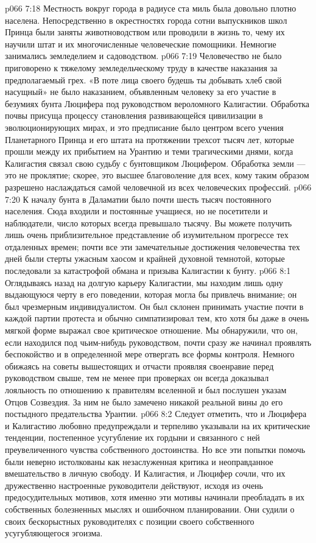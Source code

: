 \vs p066 7:18 \pc Местность вокруг города в радиусе ста миль была довольно плотно населена. Непосредственно в окрестностях города сотни выпускников школ Принца были заняты животноводством или проводили в жизнь то, чему их научили штат и их многочисленные человеческие помощники. Немногие занимались земледелием и садоводством.
\vs p066 7:19 Человечество не было приговорено к тяжелому земледельческому труду в качестве наказания за предполагаемый грех. «В поте лица своего будешь ты добывать хлеб свой насущный» не было наказанием, объявленным человеку за его участие в безумиях бунта Люцифера под руководством вероломного Калигастии. Обработка почвы присуща процессу становления развивающейся цивилизации в эволюционирующих мирах, и это предписание было центром всего учения Планетарного Принца и его штата на протяжении трехсот тысяч лет, которые прошли между их прибытием на Урантию и теми трагическими днями, когда Калигастия связал свою судьбу с бунтовщиком Люцифером. Обработка земли --- это не проклятие; скорее, это высшее благоволение для всех, кому таким образом разрешено наслаждаться самой человечной из всех человеческих профессий.
\vs p066 7:20 К началу бунта в Даламатии было почти шесть тысяч постоянного населения. Сюда входили и постоянные учащиеся, но не посетители и наблюдатели, число которых всегда превышало тысячу. Вы можете получить лишь очень приблизительное представление об изумительном прогрессе тех отдаленных времен; почти все эти замечательные достижения человечества тех дней были стерты ужасным хаосом и крайней духовной темнотой, которые последовали за катастрофой обмана и призыва Калигастии к бунту.
\vs p066 8:1 Оглядываясь назад на долгую карьеру Калигастии, мы находим лишь одну выдающуюся черту в его поведении, которая могла бы привлечь внимание; он был чрезмерным индивидуалистом. Он был склонен принимать участие почти в каждой партии протеста и обычно симпатизировал тем, кто хотя бы даже в очень мягкой форме выражал свое критическое отношение. Мы обнаружили, что он, если находился под чьим\hyp{}нибудь руководством, почти сразу же начинал проявлять беспокойство и в определенной мере отвергать все формы контроля. Немного обижаясь на советы вышестоящих и отчасти проявляя своенравие перед руководством свыше, тем не менее при проверках он всегда доказывал лояльность по отношению к правителям вселенной и был послушен указам Отцов Созвездия. За ним не было замечено никакой реальной вины до его постыдного предательства Урантии.
\vs p066 8:2 Следует отметить, что и Люцифера и Калигастию любовно предупреждали и терпеливо указывали на их критические тенденции, постепенное усугубление их гордыни и связанного с ней преувеличенного чувства собственного достоинства. Но все эти попытки помочь были неверно истолкованы как незаслуженная критика и неоправданное вмешательство в личную свободу. И Калигастия, и Люцифер сочли, что их дружественно настроенные руководители действуют, исходя из очень предосудительных мотивов, хотя именно эти мотивы начинали преобладать в их собственных болезненных мыслях и ошибочном планировании. Они судили о своих бескорыстных руководителях с позиции своего собственного усугубляющегося эгоизма.

